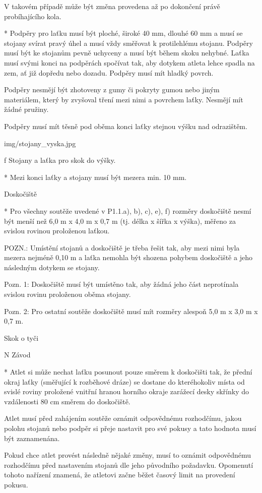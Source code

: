V takovém případě může být změna provedena až po dokončení právě probíhajícího kola.

* Podpěry pro laťku musí být ploché, široké 40 mm, dlouhé 60 mm a musí se stojany svírat pravý úhel a musí vždy směřovat k protilehlému stojanu. Podpěry musí být ke stojanům pevně uchyceny a musí být během skoku nehybné. Laťka musí svými konci na podpěrách spočívat tak, aby dotykem atleta lehce spadla na zem, ať již dopředu nebo dozadu. Podpěry musí mít hladký povrch.

Podpěry nesmějí být zhotoveny z gumy či pokryty gumou nebo jiným materiálem, který by zvyšoval tření mezi nimi a povrchem laťky. Nesmějí mít žádné pružiny.

Podpěry musí mít těsně pod oběma konci laťky stejnou výšku nad odrazištěm.

\picw=9cm \inspic img/stojany_vyska.jpg
\caption/f Stojany a laťka pro skok do výšky.

* Mezi konci laťky a stojany musí být mezera min. 10 mm.

Doskočiště

* Pro všechny soutěže uvedené v P1.1.a), b), c), e), f) rozměry doskočiště nesmí být menší než 6,0 m x 4,0 m x 0,7 m (tj. délka x šířka x výška), měřeno za svislou rovinou proloženou laťkou.

POZN.: Umístění stojanů a doskočiště je třeba řešit tak, aby mezi nimi byla mezera nejméně 0,10 m a laťka nemohla být shozena pohybem doskočiště a jeho následným dotykem se stojany.

Pozn. 1: Doskočiště musí být umístěno tak, aby žádná jeho část neprotínala svislou rovinu proloženou oběma stojany.

Pozn. 2: Pro ostatní soutěže doskočiště musí mít rozměry alespoň 5,0 m x 3,0 m x 0,7 m.
\enditems

\secc Skok o tyči

\begitems \style N
Závod

* Atlet si může nechat laťku posunout pouze směrem k doskočišti tak, že přední okraj laťky (směřující k rozběhové dráze) se dostane do kteréhokoliv místa od svislé roviny proložené vnitřní hranou horního okraje zarážecí desky skřínky do vzdálenosti 80 cm směrem do doskočiště.

Atlet musí před zahájením soutěže oznámit odpovědnému rozhodčímu, jakou polohu stojanů nebo podpěr si přeje nastavit pro své pokusy a tato hodnota musí být zaznamenána.

Pokud chce atlet provést následně nějaké změny, musí to oznámit odpovědnému rozhodčímu před nastavením stojanů dle jeho původního požadavku. Opomenutí tohoto nařízení znamená, že atletovi začne běžet časový limit na provedení pokusu.

